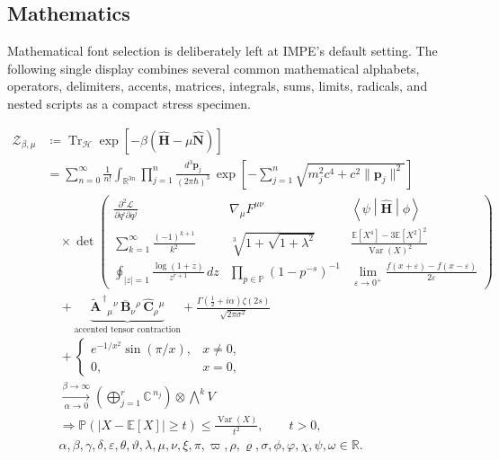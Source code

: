 \subsection{Mathematics}

Mathematical font selection is deliberately left at IMPE's default setting.
The following single display combines several common mathematical alphabets,
operators, delimiters, accents, matrices, integrals, sums, limits, radicals,
and nested scripts as a compact stress specimen.

\begingroup
\small
\[
\begin{aligned}
\mathcal Z_{\beta,\mu}
&\coloneqq
\operatorname{Tr}_{\mathscr H}
\exp\!\left[
-\beta
\left(
\widehat{\mathbf H}
-\mu\widehat{\mathbf N}
\right)
\right]
\\[0.5em]
&=
\sum_{n=0}^{\infty}
\frac{1}{n!}
\int_{\mathbb R^{3n}}
\prod_{j=1}^{n}
\frac{d^3\mathbf p_j}{(2\pi\hbar)^3}
\,
\exp\!\left[
-\sum_{j=1}^{n}
\sqrt{
m_j^2c^4+c^2\lVert\mathbf p_j\rVert^2
}
\right]
\\[0.7em]
&\quad\times
\det
\begin{pmatrix}
\displaystyle
\frac{\partial^2\mathcal L}
     {\partial q^i\partial q^j}
&
\displaystyle
\nabla_\mu F^{\mu\nu}
&
\displaystyle
\left\langle
\psi
\middle|
\widehat{\mathbf H}
\middle|
\phi
\right\rangle
\\[0.9em]
\displaystyle
\sum_{k=1}^{\infty}\frac{(-1)^{k+1}}{k^2}
&
\displaystyle
\sqrt[3]{1+\sqrt{1+\lambda^2}}
&
\displaystyle
\frac{\mathbb E[X^4]-3\mathbb E[X^2]^2}
     {\operatorname{Var}(X)^2}
\\[0.9em]
\displaystyle
\oint_{|z|=1}
\frac{\log(1+z)}{z^{r+1}}\,dz
&
\displaystyle
\prod_{p\in\mathbb P}
\left(1-p^{-s}\right)^{-1}
&
\displaystyle
\lim_{\varepsilon\to0^+}
\frac{f(x+\varepsilon)-f(x-\varepsilon)}
     {2\varepsilon}
\end{pmatrix}
\\[1em]
&\quad+
\underbrace{
\widetilde{\mathbf A}^{\,\dagger}{}_{\mu}{}^{\nu}
\,
\overline{\mathbf B}_{\nu}{}^{\rho}
\,
\widehat{\mathbf C}_{\rho}{}^{\mu}
}_{\text{accented tensor contraction}}
+
\frac{
\Gamma\!\left(\frac12+i\alpha\right)
\zeta(2s)
}{
\sqrt{2\pi\sigma^2}
}
\\[0.8em]
&\quad+
\begin{cases}
\displaystyle
e^{-1/x^2}\sin(\pi/x),
& x\ne0,
\\[0.8em]
0,
& x=0,
\end{cases}
\\[0.8em]
&\quad
\xrightarrow[\alpha\to0]{\beta\to\infty}
\left(
\bigoplus_{j=1}^{r}\mathbb C^{\,n_j}
\right)
\otimes
\bigwedge\nolimits^{k}V
\\[0.8em]
&\quad
\Longrightarrow
\mathbb P
\left(
|X-\mathbb E[X]|\ge t
\right)
\le
\frac{\operatorname{Var}(X)}{t^2},
\qquad
t>0,
\\[0.8em]
&\quad
\alpha,\beta,\gamma,\delta,\varepsilon,\theta,\vartheta,\lambda,\mu,\nu,
\xi,\pi,\varpi,\rho,\varrho,\sigma,\phi,\varphi,\chi,\psi,\omega
\in\mathbb R .
\end{aligned}
\]
\endgroup

